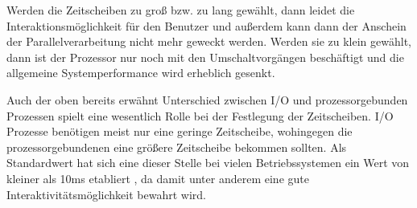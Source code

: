 Werden die Zeitscheiben zu groß bzw. zu lang gewählt, dann leidet die Interaktionsmöglichkeit für den Benutzer und außerdem kann dann der Anschein der Parallel\-ver\-arbeitung nicht mehr geweckt werden.
Werden sie zu klein gewählt, dann ist der Prozessor nur noch mit den Umschaltvorgängen beschäftigt und die allgemeine Systemperformance wird erheblich gesenkt.

Auch der oben bereits erwähnt Unterschied zwischen I/O und prozessorgebunden Prozessen spielt eine wesentlich Rolle bei der Festlegung der Zeitscheiben. I/O Prozesse benötigen meist nur eine geringe Zeitscheibe, wohingegen die prozessorgebundenen eine größere Zeitscheibe bekommen sollten. 
Als Standardwert hat sich eine dieser Stelle bei vielen Betriebssystemen ein Wert von kleiner als 10ms etabliert \cite{rlove}, da damit unter anderem eine gute Inter\-ak\-ti\-vitäts\-mög\-lich\-keit bewahrt wird.
%
